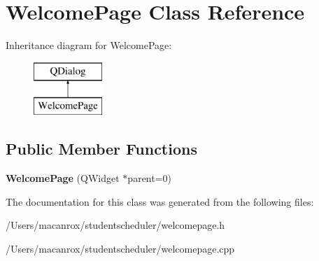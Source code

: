 \hypertarget{class_welcome_page}{\section{Welcome\-Page Class Reference}
\label{class_welcome_page}
}
Inheritance diagram for Welcome\-Page\-:\begin{figure}[H]
\begin{center}
\leavevmode
\includegraphics[height=2.000000cm]{class_welcome_page}
\end{center}
\end{figure}
\subsection*{Public Member Functions}
\begin{DoxyCompactItemize}
\item 
\hypertarget{class_welcome_page_a2759d56822391251162b7052772e33b9}{{\bfseries Welcome\-Page} (Q\-Widget $\ast$parent=0)}\label{class_welcome_page_a2759d56822391251162b7052772e33b9}

\end{DoxyCompactItemize}


The documentation for this class was generated from the following files\-:\begin{DoxyCompactItemize}
\item 
/\-Users/macanrox/studentscheduler/welcomepage.\-h\item 
/\-Users/macanrox/studentscheduler/welcomepage.\-cpp\end{DoxyCompactItemize}

